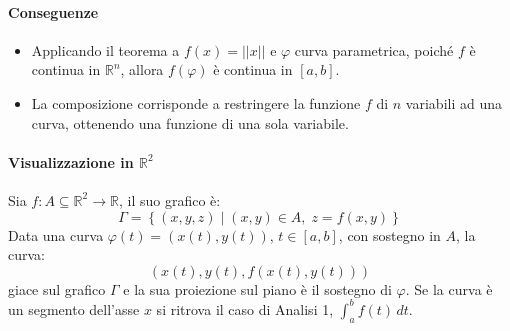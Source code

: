 \documentclass[11pt, a4paper, openright]{book}
\theoremstyle{plain}
\theoremstyle{definition}
\theoremstyle{remark}
\begin{document}
\paragraph{Conseguenze}
\begin{itemize}
    \item Applicando il teorema a $f(x) = ||x||$ e $\varphi$ curva parametrica, poiché $f$ è continua in $\mathbb{R}^n$, allora $f(\varphi)$ è continua in $[a, b]$.
    \item La composizione corrisponde a restringere la funzione $f$ di $n$ variabili ad una curva, ottenendo una funzione di una sola variabile.
\end{itemize}

\paragraph{Visualizzazione in $\mathbb{R}^2$}
Sia $f: A \subseteq \mathbb{R}^2 \longrightarrow \mathbb{R}$, il suo grafico è:
\begin{equation}
    \Gamma = \left\{(x, y, z) \mid (x, y) \in A, \; z = f(x, y)\right\}
\end{equation}
Data una curva $\varphi(t) = (x(t), y(t))$, $t \in [a, b]$, con sostegno in $A$, la curva:
\begin{equation}
    (x(t), y(t), f(x(t), y(t)))
\end{equation}
giace sul grafico $\Gamma$ e la sua proiezione sul piano è il sostegno di $\varphi$. Se la curva è un segmento dell'asse $x$ si ritrova il caso di Analisi 1, $\int_a^b f(t) \, dt$.
\end{document}
